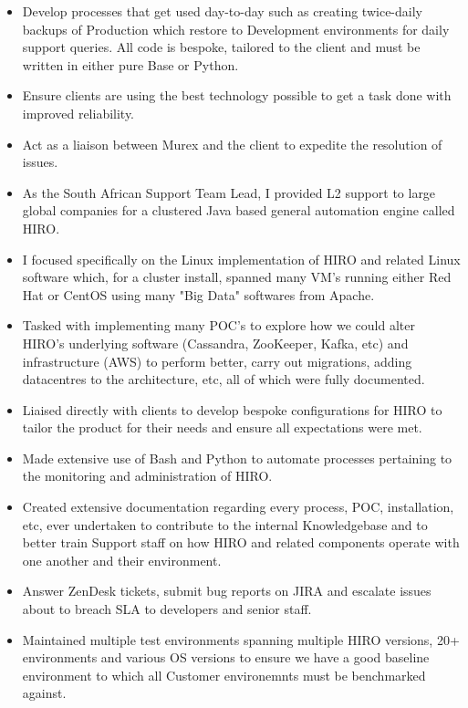 \documentclass[10pt,a4paper]{altacv}
\begin{document}
\begin{paracol}{2}
\begin{itemize}
    \item Develop processes that get used day-to-day such as creating twice-daily backups of Production which restore to Development environments for daily support queries. All code is bespoke, tailored to the client and must be written in either pure Base or Python.
    \item Ensure clients are using the best technology possible to get a task done with improved reliability.
    \item Act as a liaison between Murex and the client to expedite the resolution of issues.
\end{itemize}

\divider

\begin{itemize}
    \item As the South African Support Team Lead, I provided L2 support to large global companies for a clustered Java based general automation engine called HIRO.
    \item I focused specifically on the Linux implementation of HIRO and related Linux software which, for a cluster install, spanned many VM's running either Red Hat or CentOS using many "Big Data" softwares from Apache.
    \item Tasked with implementing many POC's to explore how we could alter HIRO's underlying software (Cassandra, ZooKeeper, Kafka, etc) and infrastructure (AWS) to perform better, carry out migrations, adding datacentres to the architecture, etc, all of which were fully documented.
    \item Liaised directly with clients to develop bespoke configurations for HIRO to tailor the product for their needs and ensure all expectations were met.
    \item Made extensive use of Bash and Python to automate processes pertaining to the monitoring and administration of HIRO.
    \item Created extensive documentation regarding every process, POC, installation, etc, ever undertaken to contribute to the internal Knowledgebase and to better train Support staff on how HIRO and related components operate with one another and their environment.
    \item Answer ZenDesk tickets, submit bug reports on JIRA and escalate issues about to breach SLA to developers and senior staff.
    \item Maintained multiple test environments spanning multiple HIRO versions, 20+ environments and various OS versions to ensure we have a good baseline environment to which all Customer environemnts must be benchmarked against.
\end{itemize}


\end{paracol}
\end{document}
